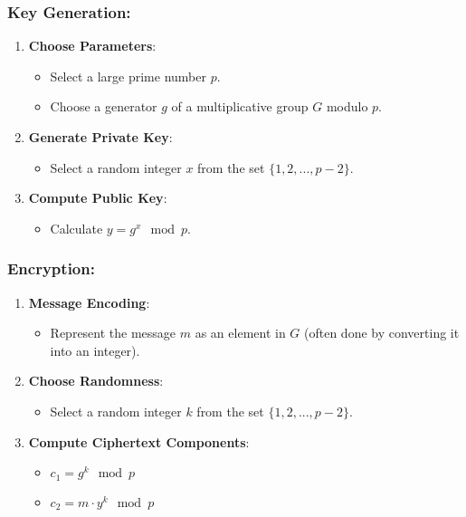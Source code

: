 \documentclass[11pt]{article}
\begin{document}
\subsubsection{Key Generation:}
\begin{enumerate}
    \item \textbf{Choose Parameters}:
    \begin{itemize}
        \item Select a large prime number \( p \).
        \item Choose a generator \( g \) of a multiplicative group \( G \) modulo \( p \).
    \end{itemize}
    
    \item \textbf{Generate Private Key}:
    \begin{itemize}
        \item Select a random integer \( x \) from the set \( \{1, 2, ..., p-2\} \).
    \end{itemize}
    
    \item \textbf{Compute Public Key}:
    \begin{itemize}
        \item Calculate \( y = g^x \mod p \).
    \end{itemize}
\end{enumerate}

\subsubsection{Encryption:}
\begin{enumerate}
    \item \textbf{Message Encoding}:
    \begin{itemize}
        \item Represent the message \( m \) as an element in \( G \) (often done by converting it into an integer).
    \end{itemize}
    
    \item \textbf{Choose Randomness}:
    \begin{itemize}
        \item Select a random integer \( k \) from the set \( \{1, 2, ..., p-2\} \).
    \end{itemize}
    
    \item \textbf{Compute Ciphertext Components}:
    \begin{itemize}
        \item \( c_1 = g^k \mod p \)
        \item \( c_2 = m \cdot y^k \mod p \)
    \end{itemize}
\end{enumerate}
\end{document}
